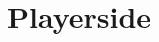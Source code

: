 \documentclass[Rapport/Rapport_main.tex]{subfiles}
\begin{document}
\section{Playerside}
\end{document}
